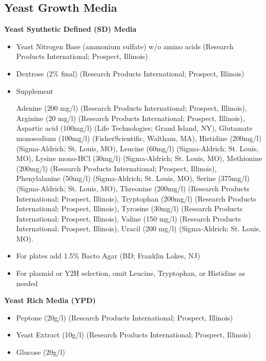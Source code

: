 \documentclass[11pt,fleqn]{book} %
\begin{document}
\subsection{Yeast Growth Media}

\textbf{Yeast Synthetic Defined (SD) Media}

\begin{itemize}
    \item Yeast Nitrogen Base (ammonium sulfate) w/o amino acids (Research Products International; Prospect, Illinois)
    \item Dextrose (2\% final) (Research Products International; Prospect, Illinois)
    \item Supplement

    Adenine (200 mg/l) (Research Products International; Prospect, Illinois), Arginine (20 mg/l) (Research Products International; Prospect, Illinois), Aspartic acid (100mg/l) (Life Technologies; Grand Island, NY), Glutamate monosodium (100mg/l) (FisherScientific, Waltham, MA), Histidine (200mg/l) (Sigma-Aldrich; St. Louis, MO), Leucine (60mg/l) (Sigma-Aldrich; St. Louis, MO), Lysine mono-HCl (30mg/l) (Sigma-Aldrich; St. Louis, MO), Methionine (200mg/l) (Research Products International; Prospect, Illinois), Phenylalanine (50mg/l) (Sigma-Aldrich; St. Louis, MO), Serine (375mg/l) (Sigma-Aldrich; St. Louis, MO), Threonine (200mg/l) (Research Products International; Prospect, Illinois), Tryptophan (200mg/l) (Research Products International; Prospect, Illinois), Tyrosine (30mg/l) (Research Products International; Prospect, Illinois), Valine (150 mg/l) (Research Products International; Prospect, Illinois), Uracil (200 mg/l) (Sigma-Aldrich; St. Louis, MO).  

    \item For plates add 1.5\% Bacto Agar (BD; Franklin Lakes, NJ)
    \item For plasmid or Y2H selection, omit Leucine, Tryptophan, or Histidine as needed
\end{itemize}


\textbf{Yeast Rich Media (YPD)}

\begin{itemize}
    \item Peptone (20g/l) (Research Products International; Prospect, Illinois)
    \item Yeast Extract (10g/l) (Research Products International; Prospect, Illinois)
    \item Glucose (20g/l)
\end{itemize}
\end{document}
